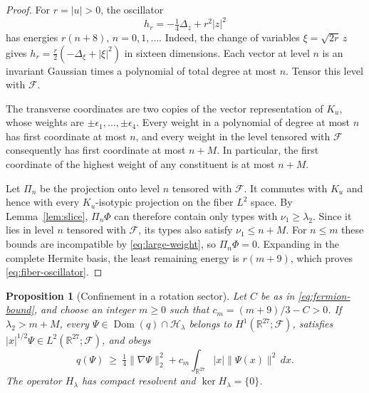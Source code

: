 \documentclass[11pt]{amsart}
\newcommand{\R}{\mathbb R}
\newcommand{\F}{\mathcal F}
\newcommand{\Hphys}{\mathcal H}
\newcommand{\Dom}{\operatorname{Dom}}
\newcommand{\norm}[1]{\lVert #1\rVert}
\newtheorem{proposition}[theorem]{Proposition}
\theoremstyle{remark}
\numberwithin{equation}{section}
\begin{document}
\begin{proof}
For $r=|u|>0$, the oscillator
\[
 h_r=-\tfrac14\Delta_z+r^2|z|^2
\]
has energies $r(n+8)$, $n=0,1,\ldots$. Indeed, the change of variables
$\xi=\sqrt{2r}\,z$ gives
$h_r=\frac r2(-\Delta_\xi+|\xi|^2)$ in sixteen dimensions.
Each vector at level $n$ is an invariant Gaussian times a polynomial
of total degree at most $n$. Tensor this level with $\F$.

The transverse coordinates are two copies of the vector representation
of $K_u$, whose weights are $\pm\epsilon_1,\ldots,\pm\epsilon_4$.
Every weight in a polynomial of degree at most $n$ has first
coordinate at most $n$, and every weight in the level tensored with
$\F$ consequently has first coordinate at most $n+M$. In particular,
the first coordinate of the highest weight of any constituent is at
most $n+M$.

Let $\Pi_n$ be the projection onto level $n$ tensored with $\F$.
It commutes with $K_u$ and hence with every $K_u$-isotypic projection
on the fiber $L^2$ space. By Lemma~\ref{lem:slice}, $\Pi_n\Phi$ can
therefore contain only types with $\nu_1\geq\lambda_2$. Since it
lies in level $n$ tensored with $\F$, its types also satisfy
$\nu_1\leq n+M$. For $n\leq m$ these bounds are incompatible by
\eqref{eq:large-weight}, so $\Pi_n\Phi=0$. Expanding in the complete
Hermite basis, the least remaining energy is $r(m+9)$, which proves
\eqref{eq:fiber-oscillator}.
\end{proof}

\begin{proposition}[Confinement in a rotation sector]
\label{prop:confinement}
Let $C$ be as in \eqref{eq:fermion-bound}, and choose an integer
$m\geq0$ such that
$c_m=(m+9)/3-C>0$. If $\lambda_2>m+M$, every
$\Psi\in\Dom(q)\cap\Hphys_\lambda$ belongs to
$H^1(\R^{27};\F)$, satisfies $|x|^{1/2}\Psi\in L^2(\R^{27};\F)$,
and obeys
\begin{equation}
 q(\Psi)\ \geq\ \tfrac14\norm{\nabla\Psi}_2^2
  +c_m\int_{\R^{27}}|x|\norm{\Psi(x)}^2\,dx.
 \label{eq:confinement}
\end{equation}
The operator $H_\lambda$ has compact resolvent and
$\ker H_\lambda=\{0\}$.
\end{proposition}
\end{document}
